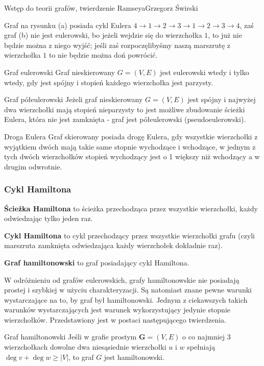 \begin{referat}{Wstęp do teorii grafów, twierdzenie Ramseya}{Grzegorz Świrski}
\begin{teoria}
Graf na rysunku (a) posiada cykl Eulera $4\to 1\to 2\to 3 \to 1 \to 2\to 3\to 4$, zaś graf (b) nie jest eulerowski, bo jeżeli wejdzie się do wierzchołka $1$, to już nie będzie można z niego wyjść; jeśli zaś rozpoczęlibyśmy naszą marszrutę z wierzchołka $1$ to nie będzie można doń powrócić.

\begin{twierdzenie}{Graf eulerowski}
Graf nieskierowany $G = (V, E)$ jest eulerowski wtedy i tylko wtedy, gdy jest spójny i stopień każdego wierzchołka jest parzysty.
\end{twierdzenie}

\begin{twierdzenie}{Graf półeulerowski}
Jeżeli graf nieskierowany $G = (V, E)$ jest spójny i najwyżej dwa wierzchołki mają stopień nieparzysty to jest możliwe zbudowanie ścieżki Eulera, która nie jest zamknięta - graf jest półeulerowski (pseudoeulerowski).
\end{twierdzenie}

\begin{twierdzenie}{Droga Eulera}
Graf skierowany posiada drogę Eulera, gdy wszystkie wierzchołki z wyjątkiem dwóch mają takie same stopnie wychodzące i wchodzące, w jednym z tych dwóch wierzchołków stopień wychodzący jest o 1 większy niż wchodzący a w drugim odwrotnie.
\end{twierdzenie}

\subsubsection{Cykl Hamiltona}
\textbf{Ścieżka Hamiltona} to ścieżka przechodząca przez wszystkie wierzchołki, każdy odwiedzając tylko jeden raz.

\textbf{Cykl Hamiltona} to cykl przechodzący przez wszystkie wierzchołki grafu (czyli marszruta zamknięta odwiedzająca każdy wierzchołek dokładnie raz).

\textbf{Graf hamiltonowski} to graf posiadający cykl Hamiltona.

W odróżnieniu od grafów eulerowskich, grafy hamiltonowskie nie posiadają prostej i szybkiej w użyciu charakteryzacji. Są natomiast znane pewne warunki wystarczające na to, by graf był hamiltonowski. Jednym z ciekawszych takich warunków wystarczających jest warunek wykorzystujący jedynie stopnie wierzchołków. Przedstawiony jest w postaci następującego twierdzenia.

\begin{twierdzenie}{Graf hamiltonowski}
Jeśli w grafie prostym $\mathbf{G}=\left( V,E \right)$ o co najmniej $3$ wierzchołkach dowolne dwa niesąsiednie wierzchołki $u$ i $w$ spełniają $\deg{v}+\deg{w}\geq \left\vert V \right\vert$, to graf $G$ jest hamiltonowski.
\end{twierdzenie}


\end{teoria}
\end{referat}
